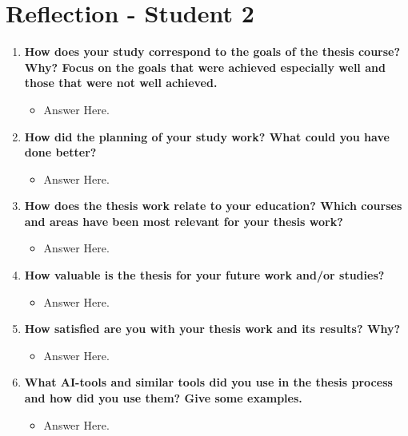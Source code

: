 \newpage
\chapter{Reflection - Student 2}

\begin{enumerate}
\item{\bf How does your study correspond to the goals of the thesis course? Why? Focus on the goals that were achieved especially well and those that were not well achieved.} 
\begin{itemize}
    \item Answer Here. 
\end{itemize}


\item{\bf How did the planning of your study work? What could you have done better?}

\begin{itemize}
    \item Answer Here. 
\end{itemize}

\item{\bf How does the thesis work relate to your education? Which courses and areas have been
most relevant for your thesis work?} 

\begin{itemize}
    \item Answer Here. 
\end{itemize}

\item{\bf How valuable is the thesis for your future work and/or studies?} 

\begin{itemize}
    \item Answer Here. 
\end{itemize}

\item{\bf How satisfied are you with your thesis work and its results? Why?} 

\begin{itemize}
    \item Answer Here. 
\end{itemize}

\item{\bf What AI-tools and similar tools did you use in the thesis process and how did you use them? Give some examples.} 

\begin{itemize}
    \item Answer Here. 
\end{itemize}

\end{enumerate}